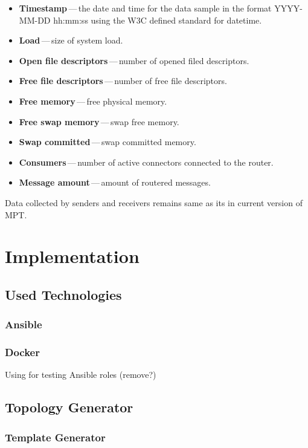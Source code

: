 \begin{itemize}
	\setlength\itemsep{0em}
	\item \textbf{Timestamp}\,---\,the date and time for the data sample in the format YYYY-MM-DD hh:mm:ss using the W3C defined standard for datetime.
	\item \textbf{Load}\,---\,size of system load.
	\item \textbf{Open file descriptors}\,---\,number of opened filed descriptors.
	\item \textbf{Free file descriptors}\,---\,number of free file descriptors.
	\item \textbf{Free memory}\,---\,free physical memory.
	\item \textbf{Free swap memory}\,---\,swap free memory.
	\item \textbf{Swap committed}\,---\,swap committed memory.
	\item \textbf{Consumers}\,---\,number of active connectors connected to the router.
	\item \textbf{Message amount}\,---\,amount of routered messages.
\end{itemize}
Data collected by senders and receivers remains same as its in current version of MPT.

\chapter{Implementation}
\label{Implementation}

\section{Used Technologies}

\subsection{Ansible}

\subsection{Docker}
Using for testing Ansible roles (remove?)

\section{Topology Generator}

\subsection{Template Generator}

